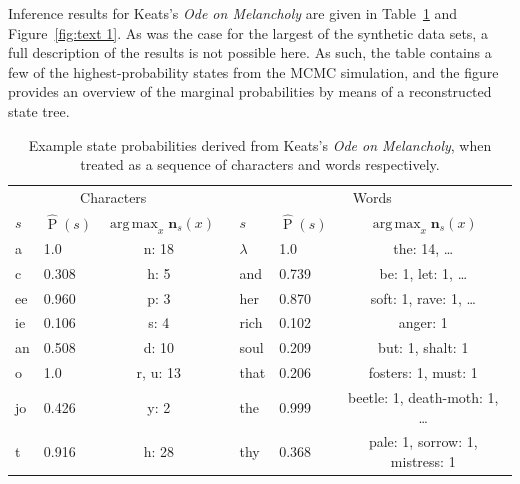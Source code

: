 \documentclass[11pt,a4paper]{article}
\newcommand\ub[1]{\symbf{#1}}                 %
\DeclareMathOperator\Pb{P}                    %
\DeclareMathOperator*{\argmax}{arg\,max}
\begin{document}
Inference results for Keats's \textit{Ode on Melancholy} are given in
Table~\ref{tab:text 1} and Figure~\ref{fig:text 1}. As was the case for the
largest of the synthetic data sets, a full description of the results is not
possible here. As such, the table contains a few of the highest-probability
states from the MCMC simulation, and the figure provides an overview of the
marginal probabilities by means of a reconstructed state tree.
%
\begin{table}[htbp]
\centering
\begin{tabular}{llccllc}
  \toprule
  \multicolumn{3}{c}{Characters} && \multicolumn{3}{c}{Words} \\
  \cmidrule{1-3} \cmidrule{5-7}
  \(s\) & \(\hat{\Pb}(s)\) & \(\argmax_x \ub{n}_s(x)\) &&
  \(s\) & \(\hat{\Pb}(s)\) & \(\argmax_x \ub{n}_s(x)\) \\
  \midrule
  a  & 1.0   & n: 18    && \(\lambda\) & 1.0   & the: 14, \dots \\
  c  & 0.308 & h: 5     && and         & 0.739 & be: 1, let: 1, \dots \\
  ee & 0.960 & p: 3     && her         & 0.870 & soft: 1, rave: 1, \dots \\
  ie & 0.106 & s: 4     && rich        & 0.102 & anger: 1 \\
  an & 0.508 & d: 10    && soul        & 0.209 & but: 1, shalt: 1 \\
  o  & 1.0   & r, u: 13 && that        & 0.206 & fosters: 1, must: 1 \\
  jo & 0.426 & y: 2     && the         & 0.999 & beetle: 1, death-moth: 1, \dots \\
  t  & 0.916 & h: 28    && thy         & 0.368 & pale: 1, sorrow: 1, mistress: 1 \\
  \bottomrule
\end{tabular}
\caption{Example state probabilities derived from Keats's \textit{Ode on
  Melancholy}, when treated as a sequence of characters and words respectively.}
\label{tab:text 1}
\end{table}
%
\end{document}
